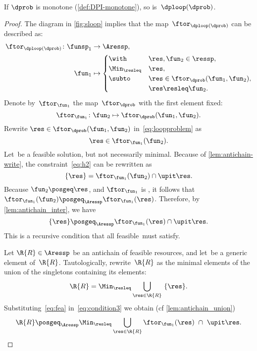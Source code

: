 \begin{proposition}
  \label{pro:loop-continuous}If $\dprob$ is monotone (\cref{def:DPI-monotone}),
  so is~$\dploop(\dprob)$.
\end{proposition}
\begin{proof}
  The diagram in \cref{fig:sloop} implies that the map~$\ftor_{\dploop(\dprob)}$
  can be described as:
  \begin{align}
    \ftor_{\dploop(\dprob)}\colon\funsp_{1} & \rightarrow\Aressp,\label{eq:loopproblem}\\
    \fun_{1} & \mapsto\begin{cases}
                        \with & \res,\fun_{2}\in\ressp,\\
                        \Min_{\resleq} & \res,\\
                        \subto & \res\in\ftor_{\dprob}(\fun_{1},\fun_{2}),\\
                        & \res\resleq\fun_{2}.
    \end{cases}
  \end{align}
  Denote by~$\ftor_{\fun_{1}}$ the map~$\ftor_{\dprob}$ with the
  first element fixed:
  \[
    \ftor_{\fun_{1}}\colon\fun_{2}\mapsto\ftor_{\dprob}(\fun_{1},\fun_{2}).
  \]
  Rewrite $\res\in\ftor_{\dprob}(\fun_{1},\fun_{2})$ in~\cref{eq:loopproblem}
  as
  \begin{equation}
    \res\in\ftor_{\fun_{1}}(\fun_{2}).\label{eq:h2}
  \end{equation}
  Let~\res be a feasible solution, but not necessarily minimal.
  Because of \cref{lem:antichain-write}, the constraint~\cref{eq:h2} can
  be rewritten as
  \begin{equation}
    \{\res\}=\ftor_{\fun_{1}}(\fun_{2})\cap\upit\res.\label{eq:h3}
  \end{equation}
  Because $\fun_{2}\posgeq\res$, and $\ftor_{\fun_{1}}$ is \scottcontinuous,
  it follows that~$\ftor_{\fun_{1}}(\fun_{2})\posgeq_{\Aressp}\ftor_{\fun_{1}}(\res)$.
  Therefore, by \cref{lem:antichain_inter}, we have
  \begin{equation}
    \{\res\}\posgeq_{\Aressp}\ftor_{\fun_{1}}(\res)\cap\upit\res.\label{eq:fea}
  \end{equation}
  This is a recursive condition that all feasible~\res must satisfy.

  Let $\R{R}\in\Aressp$ be an antichain of feasible resources, and
  let~\res be a generic element of~$\R{R}$. Tautologically, rewrite~$\R{R}$
  as the minimal elements of the union of the singletons containing
  its elements:
  \begin{equation}
    \R{R}=\Min_{\resleq}\bigcup_{\res\in\R{R}}\ \{\res\}.\label{eq:condition3}
  \end{equation}
  Substituting~\cref{eq:fea} in~\cref{eq:condition3} we obtain (cf
  \cref{lem:antichain_union})
  \begin{equation}
    \R{R}\posgeq_{\Aressp}\Min_{\resleq}\bigcup_{\res\in\R{R}}\ftor_{\fun_{1}}(\res)\ \cap\ \upit\res.\label{eq:recursive}
  \end{equation}


\end{proof}
